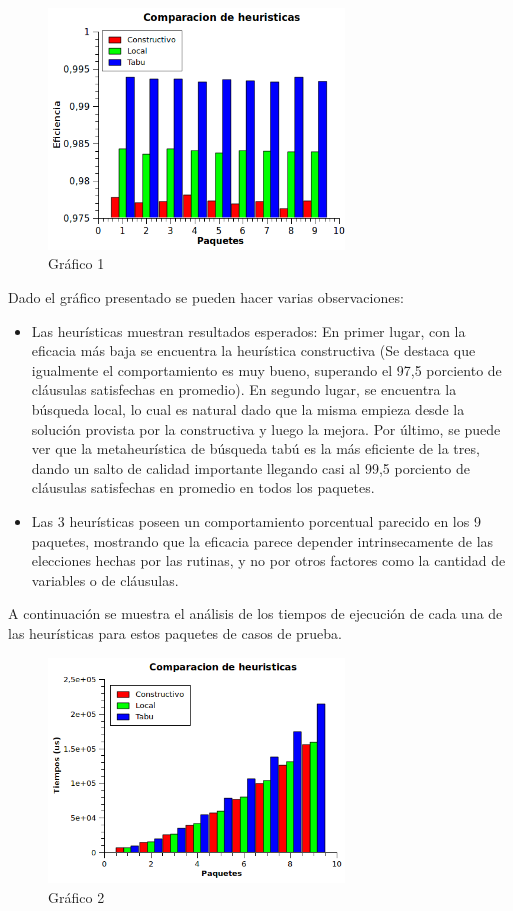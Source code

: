 \documentclass[a4paper,10pt]{article}
\begin{document}
\begin{figure}[H]
\centering
\includegraphics[width=0.7\textwidth]{graficos/combo1.png} 
\caption{Gráfico 1}
\end{figure}


Dado el gr\'afico presentado se pueden hacer varias observaciones:
\begin{itemize}
\item Las heur\'isticas muestran resultados esperados: En primer lugar, con la eficacia m\'as baja se encuentra la heur\'istica constructiva (Se destaca que igualmente el comportamiento es muy bueno, superando el 97,5 porciento de cl\'ausulas satisfechas en promedio). En segundo lugar, se encuentra la b\'usqueda local, lo cual es natural dado que la misma empieza desde la soluci\'on provista por la constructiva y luego la mejora. Por \'ultimo, se puede ver que la metaheur\'istica de b\'usqueda tab\'u es la m\'as eficiente de la tres, dando un salto de calidad importante llegando casi al 99,5 porciento de cl\'ausulas satisfechas en promedio en todos los paquetes.
\item Las 3 heur\'isticas poseen un comportamiento porcentual parecido en los 9 paquetes, mostrando que la eficacia parece depender intrinsecamente de las elecciones hechas por las rutinas, y no por otros factores como la cantidad de variables o de cl\'ausulas.
\end{itemize}


A continuaci\'on se muestra el an\'alisis de los tiempos de ejecuci\'on de cada una de las heur\'isticas para estos paquetes de casos de prueba.


\begin{figure}[H]
\centering
\includegraphics[width=0.7\textwidth]{graficos/combo1Tiempos.png} 
\caption{Gráfico 2}
\end{figure}
\end{document}
